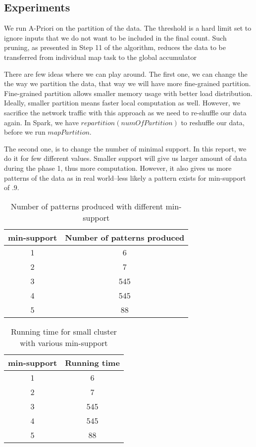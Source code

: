 \documentclass[11pt]{article}
\begin{document}
\subsection {Experiments}

We run A-Priori on the partition of the data.
The threshold is a hard limit set to ignore inputs that we do not want to be included in the final count.
Such pruning, as presented in Step 11 of the algorithm, reduces the data to be transferred from individual map task to the global accumulator

There are few ideas where we can play around.
The first one, we can change the the way we partition the data, that way we will have more fine-grained partition.
Fine-grained partition allows smaller memory usage with better load distribution.
Ideally, smaller partition means faster local computation as well.
However, we sacrifice the network traffic with this approach as we need to re-shuffle our data again.
In Spark, we have $repartition(numOfPartition)$ to reshuffle our data, before we run $mapPartition$.

The second one, is to change the number of minimal support.
In this report, we do it for few different values.
Smaller support will give us larger amount of data during the phase 1, thus more computation.
However, it also gives us more patterns of the data as in real world--less likely a pattern exists for min-support of $.9$.

\begin{table}[h!]
    \centering
    \begin{tabular}{||c c||}
        \hline
        min-support & Number of patterns produced \\ [0.5ex]
        \hline\hline
        1 & 6 \\
        2 & 7 \\
        3 & 545 \\
        4 & 545 \\
        5 & 88 \\ [1ex]
        \hline
    \end{tabular}
    \caption{Number of patterns produced with different min-support}
    \label{table:1}
\end{table}

\begin{table}[h!]
    \centering
    \begin{tabular}{||c c||}
        \hline
        min-support & Running time \\ [0.5ex]
        \hline\hline
        1 & 6 \\
        2 & 7 \\
        3 & 545 \\
        4 & 545 \\
        5 & 88 \\ [1ex]
        \hline
    \end{tabular}
    \caption{Running time for small cluster with various min-support}
    \label{table:2}
\end{table}
\end{document}
